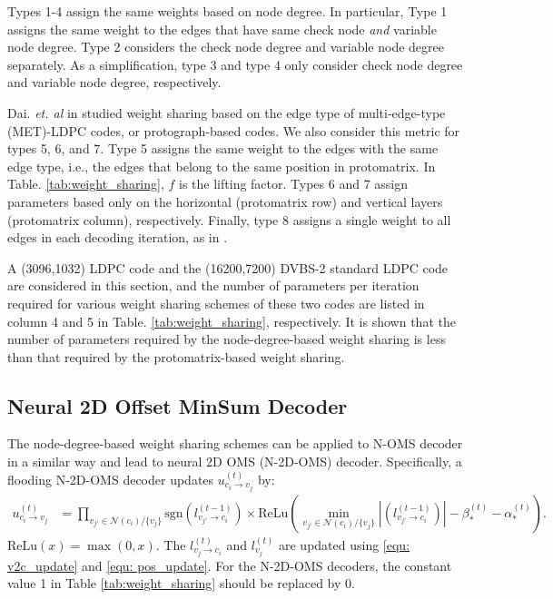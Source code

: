 \documentclass [PhD] {uclathes}
\begin{document}
Types 1-4 assign the same weights based on node degree. In particular, Type 1 assigns the same weight to the edges that have same check node \emph{and} variable node degree. Type 2 considers the check node degree and variable node degree separately. As a simplification, type 3 and type 4 only consider check node degree and variable node degree, respectively.

Dai. \emph{et. al} in \cite{dai2021learning} studied weight sharing based on the edge type of multi-edge-type (MET)-LDPC codes, or protograph-based codes. We also consider this metric for types 5, 6, and 7. Type 5  assigns the same weight to the edges with the same edge type, i.e., the edges that belong to the same position in protomatrix. In Table. \ref{tab:weight_sharing}, $f$ is the lifting factor.  Types 6 and 7 assign parameters based only on the horizontal (protomatrix row) and vertical layers (protomatrix column), respectively.
Finally, type 8 assigns a single weight to all edges in each decoding iteration, as in \cite{Lian2019-jh,Abotabl2019-wt}. 

A (3096,1032) LDPC code and the (16200,7200) DVBS-2\cite{noauthor_2019-nv} standard LDPC code are considered in this section, and the number of parameters per iteration required for various weight sharing schemes of these two codes are listed in column 4 and 5 in Table. \ref{tab:weight_sharing}, respectively. It is shown that the number of parameters required by the node-degree-based weight sharing is less than that required by the protomatrix-based weight sharing.

\subsection{Neural 2D Offset MinSum Decoder}
The node-degree-based weight sharing schemes can be applied to N-OMS decoder in a similar way and lead to neural 2D OMS (N-2D-OMS) decoder. Specifically, a flooding N-2D-OMS decoder updates  $u^{(t)}_{c_i\rightarrow v_j}$ by: 
\begin{align}
     u^{(t)}_{c_i\rightarrow v_j} &= \prod_{v_{j'}\in \mathcal{N}(c_i)/\{v_j\}} \text{sgn}\left(l^{(t-1)}_{v_{j'}\rightarrow c_{i}}\right)  \times   \text{ReLu} \left(\min_{v_{j'}\in \mathcal{N}(c_i)/\{v_j\}} \left|(l^{(t-1)}_{v_{j'}\rightarrow c_{i}})\right|-\beta^{(t)}_*-\alpha ^{(t)}_*\right).
\end{align}
${\mathrm{ReLu}}(x)=\max(0,x)$. The $l_{v_j\rightarrow c_i}^{(t)}$ and $l_{v_j}^{(t)}$ are updated using \eqref{equ: v2c_update} and \eqref{equ: pos_update}. For the N-2D-OMS decoders, the constant value 1 in Table \ref{tab:weight_sharing} should be replaced by 0. 
\end{document}

